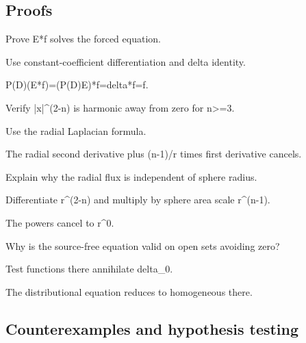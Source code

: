 \subsection*{Proofs}

\begin{exercise}\label{exr:iii24-expand-06}
Prove E*f solves the forced equation.
\end{exercise}
\begin{hint}
Use constant-coefficient differentiation and delta identity.
\end{hint}
\begin{solution}
P(D)(E*f)=(P(D)E)*f=delta*f=f.
\end{solution}

\begin{exercise}\label{exr:iii24-expand-07}
Verify |x|\textasciicircum{}(2-n) is harmonic away from zero for n>=3.
\end{exercise}
\begin{hint}
Use the radial Laplacian formula.
\end{hint}
\begin{solution}
The radial second derivative plus (n-1)/r times first derivative cancels.
\end{solution}

\begin{exercise}\label{exr:iii24-expand-08}
Explain why the radial flux is independent of sphere radius.
\end{exercise}
\begin{hint}
Differentiate r\textasciicircum{}(2-n) and multiply by sphere area scale r\textasciicircum{}(n-1).
\end{hint}
\begin{solution}
The powers cancel to r\textasciicircum{}0.
\end{solution}

\begin{exercise}\label{exr:iii24-expand-09}
Why is the source-free equation valid on open sets avoiding zero?
\end{exercise}
\begin{hint}
Test functions there annihilate delta\_0.
\end{hint}
\begin{solution}
The distributional equation reduces to homogeneous there.
\end{solution}

\subsection*{Counterexamples and hypothesis testing}

